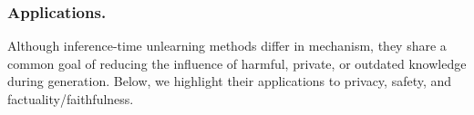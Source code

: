 

\subsubsection{Applications.}
Although inference-time unlearning methods differ in mechanism, they share a common goal of reducing the influence of harmful, private, or outdated knowledge during generation. Below, we highlight their applications to privacy, safety, and factuality/faithfulness.

